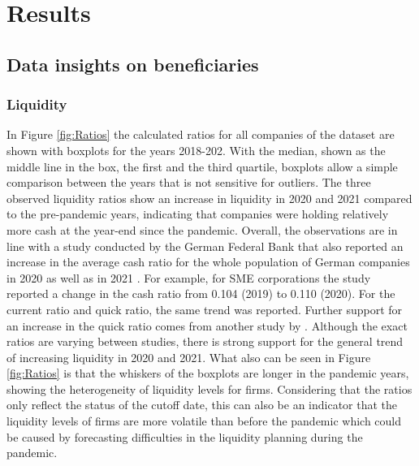 
\chapter{Results} %

\label{Chapter5} %


\section{Data insights on beneficiaries}
\label{BSratio}

\subsection{Liquidity}

In Figure \ref{fig:Ratios} the calculated ratios for all companies of the dataset are shown with boxplots for the years 2018-202. With the median, shown as the middle line in the box, the first and the third quartile, boxplots allow a simple comparison between the years that is not sensitive for outliers. The three observed liquidity ratios show an increase in liquidity in 2020 and 2021 compared to the pre-pandemic years, indicating that companies were holding relatively more cash at the year-end since the pandemic. 
Overall, the observations are in line with a study conducted by the German Federal Bank that also reported an increase in the average cash ratio for the whole population of German companies in 2020 as well as in 2021 \parencite{deutsche_bundesbank_jahresabschlussstatistik_2022}. For example, for SME corporations the study reported a change in the cash ratio from 0.104 (2019) to 0.110 (2020). For the current ratio and quick ratio, the same trend was reported. Further support for an increase in the quick ratio comes from another study by \parencite{bley_mittelstand_2022}. Although the exact ratios are varying between studies, there is strong support for the general trend of increasing liquidity in 2020 and 2021.
What also can be seen in Figure \ref{fig:Ratios} is that the whiskers of the boxplots are longer in the pandemic years, showing the heterogeneity of liquidity levels for firms. Considering that the ratios only reflect the status of the cutoff date, this can also be an indicator that the liquidity levels of firms are more volatile than before the pandemic which could be caused by forecasting difficulties in the liquidity planning during the pandemic. 


